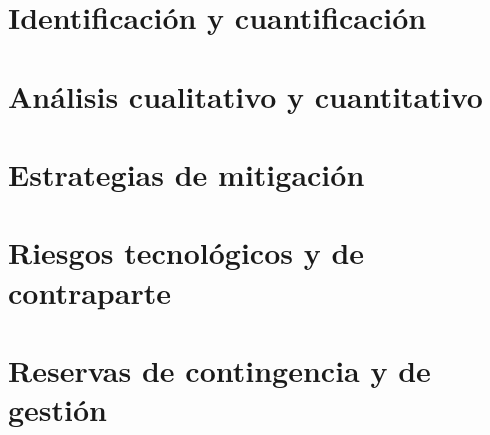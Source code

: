 
\begin{resumenApertura}
\begin{recibe}
  \item {}
\end{recibe}
\end{resumenApertura}

\section{Identificación y cuantificación}\label{sec:8-identificacion-y-cuantificacion}


\section{Análisis cualitativo y cuantitativo}\label{sec:8-analisis-cualitativo-y-cuantitat}


\section{Estrategias de mitigación}\label{sec:8-estrategias-de-mitigacion}


\section{Riesgos tecnológicos y de contraparte}\label{sec:8-riesgos-tecnologicos-y-de-contra}


\section{Reservas de contingencia y de gestión}\label{sec:8-reservas-de-contingencia-y-de-ge}

